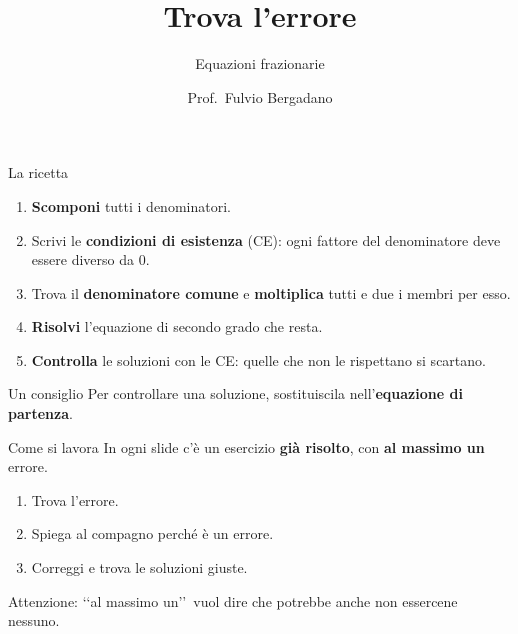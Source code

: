 \documentclass[aspectratio=169,12pt]{beamer}
\title{Trova l'errore}
\subtitle{Equazioni frazionarie}
\author{Prof.\ Fulvio Bergadano}
\institute{Liceo Vittoria}
\date{}
\begin{document}
\begin{frame}
  \titlepage
\end{frame}

\begin{frame}{La ricetta}
  \begin{block}{}
    \begin{enumerate}
      \item \textbf{Scomponi} tutti i denominatori.
      \item Scrivi le \textbf{condizioni di esistenza} (CE): ogni fattore del denominatore deve essere diverso da $0$.
      \item Trova il \textbf{denominatore comune} e \textbf{moltiplica} tutti e due i membri per esso.
      \item \textbf{Risolvi} l'equazione di secondo grado che resta.
      \item \textbf{Controlla} le soluzioni con le CE: quelle che non le rispettano si scartano.
    \end{enumerate}
  \end{block}
  \pause
  \begin{alertblock}{Un consiglio}
    Per controllare una soluzione, sostituiscila nell'\textbf{equazione di partenza}.
  \end{alertblock}
\end{frame}

\begin{frame}{Come si lavora}
  In ogni slide c'è un esercizio \textbf{già risolto}, con \textbf{al massimo un} errore.
  \bigskip
  \begin{enumerate}
    \item Trova l'errore.
    \item Spiega al compagno perché è un errore.
    \item Correggi e trova le soluzioni giuste.
  \end{enumerate}
  \bigskip
  \pause
  \textcolor{rosso}{Attenzione:} \lq\lq al massimo un\rq\rq\ vuol dire che potrebbe anche non essercene nessuno.
\end{frame}
\end{document}
